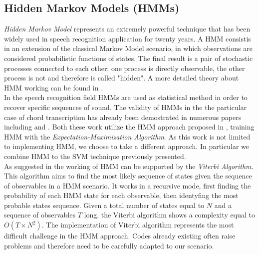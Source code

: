 \subsection{Hidden Markov Models (HMMs)}
\label{subsec:hmm}

\textit{Hidden Markov Model} represents an extremely powerful technique that has been widely used in speech recognition application for twenty years. A HMM consistis in an extension of the classical Markov Model scenario, in which observations are considered probabilistic functions of states. The final result is a pair of stochastic processes connected to each other; one process is directly observable, the other process is not and therefore is called "hidden". A more detailed theory about HMM working can be found in \cite{LawrenceHMMtutorial}. \\
%
In the speech recognition field HMMs are used as statistical method in order to recover specific sequences of sound. The validity of HMMs in the the particular case of chord transcription has already been demostrated in numerous papers including \cite{AlexDanEMplusHMM} and \cite{belpickMusic}. Both these work utilize the HMM approach proposed in \cite{GoldMorganSpeechRecogn}, training HMM with the \textit{Expectation-Maximization Algorithm}. As this work is not limited to implementing HMM, we choose to take a different approach. In particular we combine HMM to the SVM technique previously presented. \\
%
As suggested in \cite{GoldMorganSpeechRecogn} the working of HMM can be supported by the \textit{Viterbi Algorithm}. This algorithm aims to find the most likely sequence of states given the sequence of observables in a HMM scenario. It works in a recursive mode, first finding the probability of each HMM state for each observable, then identyfing the most probable states sequence. Given a total number of states equal to $N$ and a sequence of observables $T$ long, the Viterbi algorithm shows a complexity equal to $O(T \times N^2)$. The implementation of Viterbi algorithm represents the most difficult challenge in the HMM approach. Codes already existing often raise problems and therefore need to be carefully adapted to our scenario.
